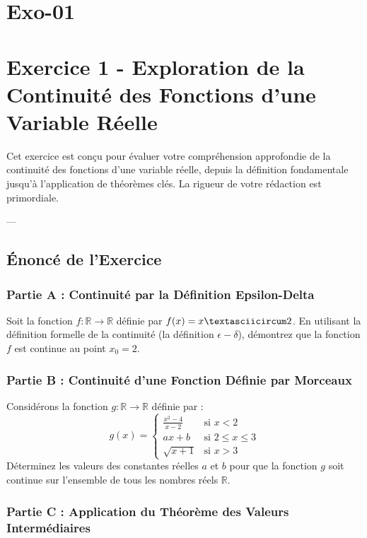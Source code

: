 \documentclass[12pt,a4paper]{report}
\begin{document}
\section{Exo-01}
\section{Exercice 1 - Exploration de la Continuité des Fonctions d'une Variable Réelle}

Cet exercice est conçu pour évaluer votre compréhension approfondie de la continuité des fonctions d'une variable réelle, depuis la définition fondamentale jusqu'à l'application de théorèmes clés. La rigueur de votre rédaction est primordiale.

---

\subsection{Énoncé de l'Exercice}

\subsubsection{Partie A : Continuité par la Définition Epsilon-Delta}

Soit la fonction $f: \mathbb{R} \to \mathbb{R}$ définie par $f(x) = x\textasciicircum 2$.
En utilisant la définition formelle de la continuité (la définition $\epsilon-\delta$), démontrez que la fonction $f$ est continue au point $x_0 = 2$.

\subsubsection{Partie B : Continuité d'une Fonction Définie par Morceaux}

Considérons la fonction $g: \mathbb{R} \to \mathbb{R}$ définie par :
$$
g(x) = \begin{cases}
    \frac{x^2 - 4}{x - 2} & \text{si } x < 2 \\
    ax + b & \text{si } 2 \le x \le 3 \\
    \sqrt{x + 1} & \text{si } x > 3
\end{cases}
$$
Déterminez les valeurs des constantes réelles $a$ et $b$ pour que la fonction $g$ soit continue sur l'ensemble de tous les nombres réels $\mathbb{R}$.

\subsubsection{Partie C : Application du Théorème des Valeurs Intermédiaires}
\end{document}
